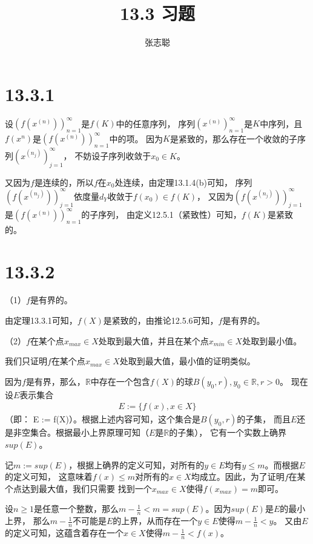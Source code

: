 \documentclass{article}
\begin{document}
\title{13.3 习题}
\author{张志聪}
\maketitle

\section*{13.3.1}

设$(f(x^{(n)}))_{n = 1}^\infty$是$f(K)$中的任意序列，
序列$(x^{(n)})_{n = 1}^\infty$是$K$中序列，且$f(x^{n})$是$(f(x^{(n)}))_{n = 1}^\infty$中的项。
因为$K$是紧致的，那么存在一个收敛的子序列$(x^{(n_j)})_{j = 1}^\infty$，
不妨设子序列收敛于$x_0 \in K$。

又因为$f$是连续的，所以$f$在$x_0$处连续，由定理13.1.4(b)可知，
序列$(f(x^{(n_j)}))_{j = 1}^\infty$依度量$d_Y$收敛于$f(x_0) \in f(K)$，
又因为$(f(x^{(n_j)}))_{j = 1}^\infty$是$(f(x^{(n)}))_{n = 1}^\infty$的子序列，
由定义12.5.1（紧致性）可知，$f(K)$是紧致的。

\section*{13.3.2}

（1）$f$是有界的。

由定理13.3.1可知，$f(X)$是紧致的，由推论12.5.6可知，$f$是有界的。


（2）$f$在某个点$x_{max} \in X$处取到最大值，并且在某个点$x_{min} \in X$处取到最小值。

我们只证明$f$在某个点$x_{max} \in X$处取到最大值，最小值的证明类似。

因为$f$是有界，那么，$\mathbb{R}$中存在一个包含$f(X)$的球$B(y_0, r), y_0 \in \mathbb{R}, r > 0$。
现在设$E$表示集合
\begin{align*}
  E := \{f(x), x \in X\}
\end{align*}
（即： E := f(X)）。根据上述内容可知，这个集合是$B(y_0, r)$的子集，
而且$E$还是非空集合。根据最小上界原理可知（$E$是$\mathbb{R}$的子集），
它有一个实数上确界$sup(E)$。

记$m := sup(E)$，根据上确界的定义可知，对所有的$y \in E$均有$y \leq m$。而根据$E$的定义可知，
这意味着$f(x) \leq m$对所有的$x \in X$均成立。因此，为了证明$f$在某个点达到最大值，我们只需要
找到一个$x_{max} \in X$使得$f(x_{max}) = m$即可。

设$n \geq 1$是任意一个整数，那么$m - \frac{1}{n} < m = sup(E)$。因为$sup(E)$是$E$的最小上界，
那么$m - \frac{1}{n}$不可能是$E$的上界，从而存在一个$y \in E$使得$m - \frac{1}{n} < y$。
又由$E$的定义可知，这蕴含着存在一个$x \in X$使得$m - \frac{1}{n} < f(x)$。
\end{document}
